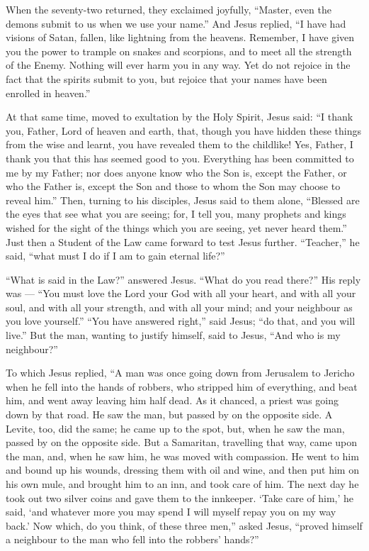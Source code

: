  When the seventy-two returned, they exclaimed joyfully,
``Master, even the demons submit to us when we use your name.''
 And Jesus replied, ``I have had visions of Satan, fallen,
like lightning from the heavens.  Remember, I have given
you the power to trample on snakes and scorpions, and to meet all the
strength of the Enemy. Nothing will ever harm you in any way.
 Yet do not rejoice in the fact that the spirits submit to
you, but rejoice that your names have been enrolled in heaven.''

 At that same time, moved to exultation by the Holy Spirit,
Jesus said: ``I thank you, Father, Lord of heaven and earth, that,
though you have hidden these things from the wise and learnt, you have
revealed them to the childlike! Yes, Father, I thank you that this has
seemed good to you.  Everything has been committed to me by
my Father; nor does anyone know who the Son is, except the Father, or
who the Father is, except the Son and those to whom the Son may choose
to reveal him.''  Then, turning to his disciples, Jesus
said to them alone, ``Blessed are the eyes that see what you are seeing;
 for, I tell you, many prophets and kings wished for the
sight of the things which you are seeing, yet never heard them.''
 Just then a Student of the Law came forward to test Jesus
further. ``Teacher,'' he said, ``what must I do if I am to gain eternal
life?''

 ``What is said in the Law?'' answered Jesus. ``What do you
read there?''  His reply was --- ``You must love the Lord
your God with all your heart, and with all your soul, and with all your
strength, and with all your mind; and your neighbour as you love
yourself.''  ``You have answered right,'' said Jesus; ``do
that, and you will live.''  But the man, wanting to justify
himself, said to Jesus, ``And who is my neighbour?''

 To which Jesus replied, ``A man was once going down from
Jerusalem to Jericho when he fell into the hands of robbers, who
stripped him of everything, and beat him, and went away leaving him half
dead.  As it chanced, a priest was going down by that road.
He saw the man, but passed by on the opposite side.  A
Levite, too, did the same; he came up to the spot, but, when he saw the
man, passed by on the opposite side.  But a Samaritan,
travelling that way, came upon the man, and, when he saw him, he was
moved with compassion.  He went to him and bound up his
wounds, dressing them with oil and wine, and then put him on his own
mule, and brought him to an inn, and took care of him.  The
next day he took out two silver coins and gave them to the innkeeper.
`Take care of him,' he said, `and whatever more you may spend I will
myself repay you on my way back.'  Now which, do you think,
of these three men,'' asked Jesus, ``proved himself a neighbour to the
man who fell into the robbers' hands?''

